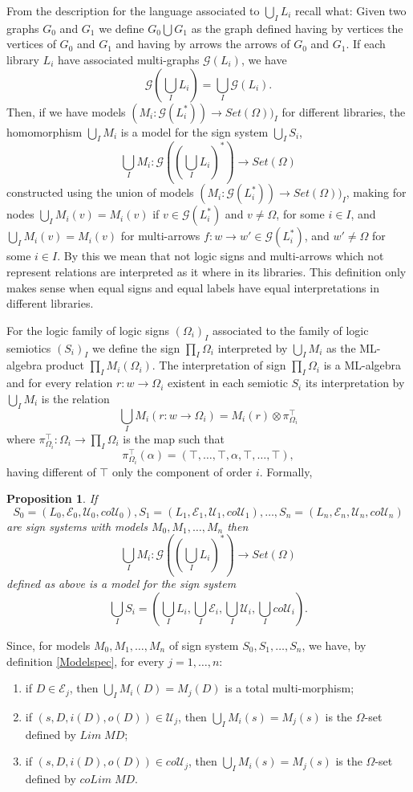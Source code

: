 \documentclass[oribibl]{llncs}
\newtheorem{prop}{Proposition}
\newcommand{\E}{\mathcal{E}}
\newcommand{\G}{\mathcal{G}}
\newcommand{\U}{\mathcal{U}}
\begin{document}
From the description for the language associated to $\bigcup_IL_i$ recall what: Given two graphs $G_0$ and $G_1$ we define $G_0\bigcup G_1$ as the graph defined having by vertices the vertices of $G_0$ and $G_1$ and having by arrows the arrows of $G_0$ and $G_1$. If each library $L_i$ have associated multi-graphs $\G(L_i)$, we have \[\G(\bigcup_IL_i)=\bigcup_I\G(L_i).\]
Then, if we have models  $(M_i:\G(L_i^\ast))\rightarrow Set(\Omega))_I$ for different libraries, the homomorphism  $\bigcup_IM_i$ is a model for the sign system $\bigcup_IS_i$, \[\bigcup_IM_i:\G((\bigcup_IL_i)^\ast)\rightarrow Set(\Omega)\] constructed using the union of models $(M_i:\G(L_i^\ast))\rightarrow Set(\Omega))_I$, making for nodes $\bigcup_IM_i(v)=M_i(v)$ if $v\in \G(L_i^\ast)$ and $v\neq\Omega$, for some $i\in I$, and $\bigcup_IM_i(v)=M_i(v)$ for multi-arrows $f:w\rightarrow w'\in \G(L_i^\ast)$, and $w'\neq \Omega$ for some $i\in I$. By this we mean that not logic signs and multi-arrows which not represent relations are interpreted as it where in its libraries. This definition only makes sense when equal signs and equal labels have equal interpretations in different libraries.

For the logic family of logic signs $(\Omega_i)_I$ associated to the family of logic semiotics $(S_i)_I$ we define the sign $\prod_I\Omega_i$ interpreted by $\bigcup_IM_i$ as the ML-algebra product $\prod_IM_i(\Omega_i)$. The interpretation of sign $\prod_I\Omega_i$ is a ML-algebra and for every relation $r:w\rightarrow \Omega_i$ existent in each semiotic $S_i$ its interpretation by $\bigcup_IM_i$ is the relation
\[\bigcup_IM_i(r:w\rightarrow \Omega_i)=M_i(r)\otimes \pi^\top_{\Omega_i}\]
where $\pi^\top_{\Omega_i}:\Omega_i\rightarrow \prod_I\Omega_i$ is the map such that \[\pi^\top_{\Omega_i}(\alpha)=(\top,\ldots,\top,\alpha,\top,\ldots,\top),\] having different of $\top$ only the component of order $i$. Formally,

\begin{prop}
If \[S_0=(L_0,\E_0,\U_0,co\U_0),S_1=(L_1,\E_1,\U_1,co\U_1),\ldots,S_n=(L_n,\E_n,\U_n,co\U_n)\] are sign systems with models $M_0,M_1,\ldots,M_n$ then
\[\bigcup_IM_i:\G((\bigcup_IL_i)^\ast)\rightarrow Set(\Omega)\] defined as above is a model for the sign system  \[\bigcup_IS_i=(\bigcup_IL_i,\bigcup_I\E_i,\bigcup_I\U_i,\bigcup_Ico\U_i).\]
\end{prop}

Since, for models $M_0,M_1,\ldots,M_n$ of sign system $S_0,S_1,\ldots,S_n$, we have, by definition \ref{Modelspec}, for every $j=1,\ldots,n$:
\begin{enumerate}
  \item if $D\in\E_j$, then $\bigcup_IM_i(D)=M_j(D)$ is a total multi-morphism;
  \item if $(s,D,i(D),o(D))\in\U_j$, then $\bigcup_IM_i(s)= M_j(s)$ is the $\Omega$-set defined by $Lim\;MD$;
  \item if $(s,D,i(D),o(D))\in co\U_j$, then $\bigcup_IM_i(s)= M_j(s)$ is the $\Omega$-set defined by $coLim\;MD$.
\end{enumerate}
\end{document}
